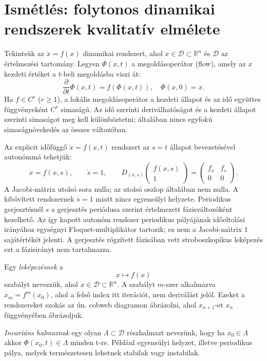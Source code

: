 \chapter{Ismétlés: folytonos dinamikai rendszerek kvalitatív elmélete}

Tekintsük az $\dot{x}=f(x)$ dinamikai rendszert, ahol $x \in \mathcal{D} \subset \mathbb{R}^n$ és $\mathcal{D}$ az értelmezési tartomány. Legyen $\Phi(x,t)$ a megoldásoperátor (flow), amely az $x$ kezdeti értéket a $t$-beli megoldásba viszi át:
\[
\frac{\partial}{\partial t} \Phi(x,t)=f(\Phi(x,t)), \quad \Phi(x,0)=x.
\]
Ha $f\in C^r$ ($r\geq1$), a lokális megoldásoperátor a kezdeti állapot és az idő együttes függvényeként $C^r$ simaságú. Az idő szerinti deriválhatóságot és a kezdeti állapot szerinti simaságot meg kell különböztetni; általában nincs egyfokú simaságnövekedés az összes változóban.

Az explicit időfüggő $\dot{x}=f(x,t)$ rendszert az $s=t$ állapot bevezetésével autonómmá tehetjük:
\[
\dot{x}=f(x,s),\qquad \dot{s}=1,\qquad
D_{(x,s)}\begin{pmatrix}f(x,s)\\1\end{pmatrix}
=\begin{pmatrix}f_x&f_s\\0&0\end{pmatrix}.
\]
A Jacobi-mátrix utolsó sora nulla; az utolsó oszlop általában nem nulla. A kibővített rendszernek $\dot{s}=1$ miatt nincs egyensúlyi helyzete. Periodikus gerjesztésnél $s$ a gerjesztés periódusa szerint értelmezett fázisváltozóként kezelhető. Az így kapott autonóm rendszer periodikus pályájának időeltolási irányához egységnyi Floquet-multiplikátor tartozik; ez nem a Jacobi-mátrix $1$ sajátértékét jelenti. A gerjesztés rögzített fázisában vett stroboszkopikus leképezés ezt a fázisirányt nem tartalmazza.

Egy \emph{leképezésnek}  a
\[
x\mapsto f(x)
\]
szabályt nevezzük, ahol $x \in \mathcal{D} \subset \mathbb{R}^n$. A szabályt $m$-szer alkalmazva $x_m=f^m(x_0)$, ahol a felső index itt iterációt, nem deriválást jelöl. Ezeket a rendszereket szokás az ún. cobweb diagramon ábrázolni, ahol $x_{n+1}$-et $x_n$ függvényében ábrázoljuk.

\emph{Invariáns halmaznak} egy olyan $\Lambda \subset \mathcal{D}$ részhalmazt nevezünk, hogy ha $x_0 \in \Lambda$ akkor $\Phi(x_0,t) \in \Lambda$ minden t-re. Például egyensúlyi helyzet, illetve periodikus pálya, melyek természetesen lehetnek stabilak vagy instabilak.

